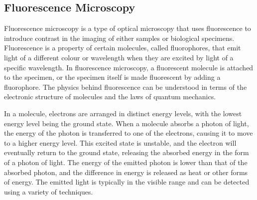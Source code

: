 \subsection{Fluorescence Microscopy}%
Fluorescence microscopy is a type of optical microscopy that uses fluorescence to introduce contrast in the imaging of either samples or biological specimens. Fluorescence is a property of certain molecules, called fluorophores, that emit light of a different colour or wavelength when they are excited by light of a specific wavelength. In fluorescence microscopy, a fluorescent molecule is attached to the specimen, or the specimen itself is made fluorescent by adding a fluorophore. The physics behind fluorescence can be understood in terms of the electronic structure of molecules and the laws of quantum mechanics. 

In a molecule, electrons are arranged in distinct energy levels, with the lowest energy level being the ground state. When a molecule absorbs a photon of light, the energy of the photon is transferred to one of the electrons, causing it to move to a higher energy level. This excited state is unstable, and the electron will eventually return to the ground state, releasing the absorbed energy in the form of a photon of light. The energy of the emitted photon is lower than that of the absorbed photon, and the difference in energy is released as heat or other forms of energy. The emitted light is typically in the visible range and can be detected using a variety of techniques.
